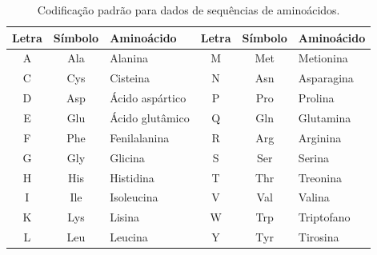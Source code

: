 \documentclass[english,brazilian]{UNISINOSmonografia} %
\newcommand\defaultFigureWidth{0.9}
\begin{document}
\begin{table}[tb]
\centering%
\begin{minipage}{\defaultFigureWidth\textwidth}
	\caption{Codificação padrão para dados de sequências de aminoácidos.}
	\label{tab:amino-codes}
	\setlength{\tabcolsep}{9pt}
	\vspace{1ex}
	\begin{tabularx}{\textwidth}{ccX|ccX}
		\toprule
		Letra & Símbolo & Aminoácido            & Letra & Símbolo & Aminoácido       \\
		\midrule
		A          & Ala     & Alanina         & M          & Met     & Metionina  \\
		C          & Cys     & Cisteina        & N          & Asn     & Asparagina \\
		D          & Asp     & Ácido aspártico & P          & Pro     & Prolina    \\
		E          & Glu     & Ácido glutâmico & Q          & Gln     & Glutamina  \\
		F          & Phe     & Fenilalanina    & R          & Arg     & Arginina   \\
		G          & Gly     & Glicina         & S          & Ser     & Serina     \\
		H          & His     & Histidina       & T          & Thr     & Treonina   \\
		I          & Ile     & Isoleucina      & V          & Val     & Valina     \\
		K          & Lys     & Lisina          & W          & Trp     & Triptofano \\
		L          & Leu     & Leucina         & Y          & Tyr     & Tirosina   \\
		\bottomrule
	\end{tabularx}
\end{minipage}
\end{table}
\end{document}
